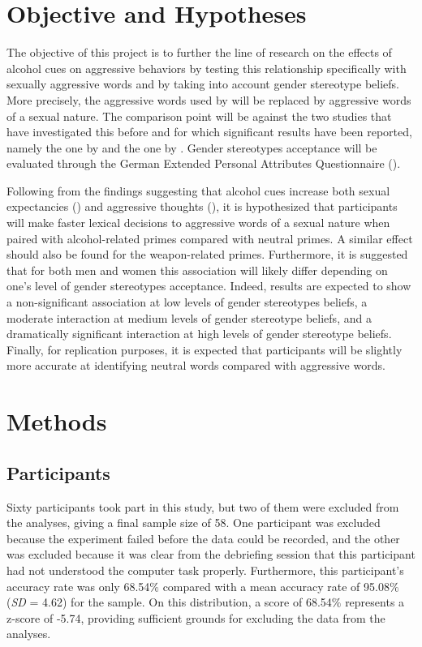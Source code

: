 \documentclass[serif, authorddate, twocolumn, empirical]{jote-article}
\begin{document}
\section*{Objective and Hypotheses}
The objective of this project is to further the line of research on the effects of alcohol cues on aggressive behaviors by testing this relationship specifically with sexually aggressive words and by taking into account gender stereotype beliefs. More precisely, the aggressive words used by \textcite{BartholowHeinz2006} will be replaced by aggressive words of a sexual nature. The comparison point will be against the two studies that have investigated this before and for which significant results have been reported, namely the one by \textcite{BartholowHeinz2006} and the one by \textcite{SubraMullerBegueLBushmanDelmas2010}. Gender stereotypes acceptance will be evaluated through the German Extended Personal Attributes Questionnaire (\cite{RungeFreyGollwitzerHelmreichSpence1981}).

Following from the findings suggesting that alcohol cues increase both sexual expectancies (\cite{FriedmanMcCarthyForsterJDenzler2005}) and aggressive thoughts (\cite{BartholowHeinz2006}), it is hypothesized that participants will make faster lexical decisions to aggressive words of a sexual nature when paired with alcohol-related primes compared with neutral primes. A similar effect should also be found for the weapon-related primes. Furthermore, it is suggested that for both men and women this association will likely differ depending on one’s level of gender stereotypes acceptance. Indeed, results are expected to show a non-significant association at low levels of gender stereotypes beliefs, a moderate interaction at medium levels of gender stereotype beliefs, and a dramatically significant interaction at high levels of gender stereotype beliefs. Finally, for replication purposes, it is expected that participants will be slightly more accurate at identifying neutral words compared with aggressive words. 

{}
\section*{Methods} %
\label{sec:methods}

{}
\subsection*{Participants}
Sixty participants took part in this study, but two of them were excluded from the analyses, giving a final sample size of 58. One participant was excluded because the experiment failed before the data could be recorded, and the other was excluded because it was clear from the debriefing session that this participant had not understood the computer task properly. Furthermore, this participant’s accuracy rate was only 68.54$\%$  compared with a mean accuracy rate of 95.08$\%$  (\textit{SD }= 4.62) for the sample. On this distribution, a score of 68.54$\%$  represents a z-score of -5.74, providing sufficient grounds for excluding the data from the analyses. 
\end{document}
